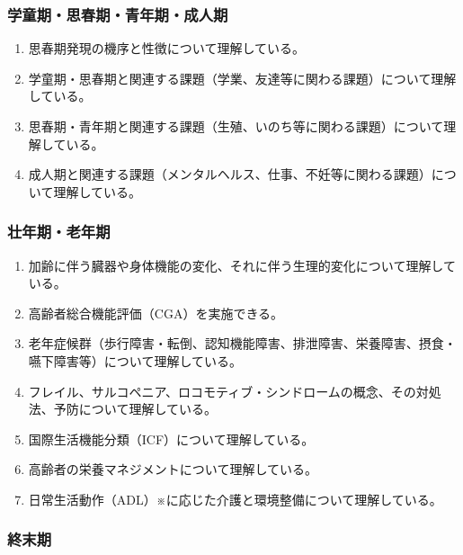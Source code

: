 \documentclass[
]{ltjsarticle}
\providecommand{\tightlist}{%
  \setlength{\itemsep}{0pt}\setlength{\parskip}{0pt}}
\begin{document}
\hypertarget{ux5b66ux7ae5ux671fux601dux6625ux671fux9752ux5e74ux671fux6210ux4ebaux671f}{%
\subsubsection{学童期・思春期・青年期・成人期}\label{ux5b66ux7ae5ux671fux601dux6625ux671fux9752ux5e74ux671fux6210ux4ebaux671f}}

\begin{enumerate}
\def\labelenumi{\arabic{enumi}.}
\tightlist
\item
  思春期発現の機序と性徴について理解している。
\item
  学童期・思春期と関連する課題（学業、友達等に関わる課題）について理解している。
\item
  思春期・青年期と関連する課題（生殖、いのち等に関わる課題）について理解している。
\item
  成人期と関連する課題（メンタルヘルス、仕事、不妊等に関わる課題）について理解している。
\end{enumerate}

\hypertarget{ux58eeux5e74ux671fux8001ux5e74ux671f}{%
\subsubsection{壮年期・老年期}\label{ux58eeux5e74ux671fux8001ux5e74ux671f}}

\begin{enumerate}
\def\labelenumi{\arabic{enumi}.}
\tightlist
\item
  加齢に伴う臓器や身体機能の変化、それに伴う生理的変化について理解している。
\item
  高齢者総合機能評価（CGA）を実施できる。
\item
  老年症候群（歩行障害・転倒、認知機能障害、排泄障害、栄養障害、摂食・嚥下障害等）について理解している。
\item
  フレイル、サルコペニア、ロコモティブ・シンドロームの概念、その対処法、予防について理解している。
\item
  国際生活機能分類（ICF）について理解している。
\item
  高齢者の栄養マネジメントについて理解している。
\item
  日常生活動作（ADL）※に応じた介護と環境整備について理解している。
\end{enumerate}

\hypertarget{ux7d42ux672bux671f}{%
\subsubsection{終末期}\label{ux7d42ux672bux671f}}
\end{document}
